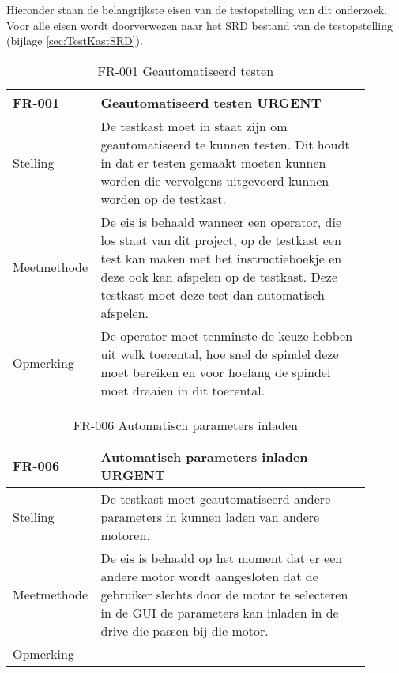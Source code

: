 Hieronder staan de belangrijkste eisen van de testopstelling van dit onderzoek. Voor alle eisen wordt doorverwezen naar het SRD bestand van de testopstelling (bijlage \ref{sec:TestKastSRD}).

\vspace{0.5cm}

\begin{table}[ht]
	\caption{FR-001 Geautomatiseerd testen}
	\label{tab:FR-001}
	\centering
	\begin{tabular}{|p{0.15\linewidth}|p{0.75\linewidth}|}
		\hline
		FR-001 & Geautomatiseerd testen URGENT \\
		
		\hline
		
		Stelling & De testkast moet in staat zijn om geautomatiseerd te kunnen testen. Dit houdt in dat er testen gemaakt moeten kunnen worden die vervolgens uitgevoerd kunnen worden op de testkast.\\
		
		Meetmethode & De eis is behaald wanneer een operator, die los staat van dit project, op de testkast een test kan maken met het instructieboekje en deze ook kan afspelen op de testkast. Deze testkast moet deze test dan automatisch afspelen. \\
		
		Opmerking & De operator moet tenminste de keuze hebben uit welk toerental, hoe snel de spindel deze moet bereiken en voor hoelang de spindel moet draaien in dit toerental. \\
		\hline
	\end{tabular}
\end{table}

\vspace{0.5cm}

\begin{table}[ht]
	\caption{FR-006 Automatisch parameters inladen}
	\label{tab:FR-006}
	\centering
	\begin{tabular}{|p{0.15\linewidth}|p{0.75\linewidth}|}
		\hline
		FR-006 & Automatisch parameters inladen URGENT \\
		
		\hline
		
		Stelling & De testkast moet geautomatiseerd andere parameters in kunnen laden van andere motoren.\\
		
		Meetmethode & De eis is behaald op het moment dat er een andere motor wordt aangesloten dat de gebruiker slechts door de motor te selecteren in de GUI de parameters kan inladen in de drive die passen bij die motor. \\
		
		Opmerking &  \\
		\hline
	\end{tabular}
\end{table}

